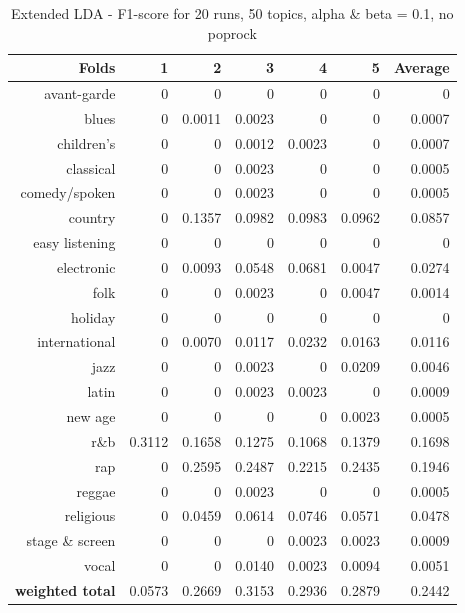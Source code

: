 \begin{table}[h]\label{table:extended_nopoprock}
\begin{center}
\begin{tabular}{| r | r | r | r | r | r | r |}
\hline
\textbf{Folds} &  \textbf{1} & \textbf{2} & \textbf{3} & \textbf{4} & \textbf{5} & \textbf{Average}\\
\hline
avant-garde & 0 & 0 & 0 & 0 & 0 & 0\\
blues & 0 & 0.0011 & 0.0023 & 0 & 0 & 0.0007\\
children's & 0 & 0 & 0.0012 & 0.0023 & 0 & 0.0007\\
classical & 0 & 0  & 0.0023 & 0 & 0 & 0.0005\\
comedy/spoken & 0 & 0 & 0.0023 & 0 & 0 & 0.0005 \\
country & 0 & 0.1357 & 0.0982 & 0.0983 & 0.0962 & 0.0857 \\
easy listening & 0 & 0 & 0 & 0 & 0 & 0 \\
electronic & 0 & 0.0093 & 0.0548 & 0.0681 & 0.0047 & 0.0274\\
folk & 0 & 0 & 0.0023 & 0 & 0.0047 & 0.0014\\
holiday & 0 & 0 & 0 & 0 & 0 & 0 \\
international & 0 & 0.0070 & 0.0117 & 0.0232 & 0.0163 & 0.0116\\
jazz & 0 & 0 & 0.0023 & 0 & 0.0209 & 0.0046 \\
latin & 0 & 0 & 0.0023 & 0.0023 & 0 & 0.0009\\
new age & 0 & 0 & 0 & 0 & 0.0023 & 0.0005\\\
r\&b & 0.3112 & 0.1658 & 0.1275 &  0.1068 & 0.1379& 0.1698\\
rap & 0 & 0.2595 & 0.2487 & 0.2215 & 0.2435 & 0.1946\\
reggae & 0 & 0 & 0.0023 & 0 & 0 & 0.0005\\
religious & 0 & 0.0459 & 0.0614 & 0.0746 & 0.0571 & 0.0478\\
stage \& screen & 0 & 0 & 0 & 0.0023 & 0.0023 & 0.0009\\
vocal & 0 & 0 & 0.0140 & 0.0023 & 0.0094 & 0.0051\\
\hline
\textbf{weighted total} &  0.0573 & 0.2669 & 0.3153 & 0.2936 & 0.2879 & 0.2442\\
\hline
\end{tabular}
\end{center}
\caption{Extended LDA - F1-score for 20 runs, 50 topics, alpha \& beta = 0.1, no poprock}
\label{extldatable}
\end{table}

